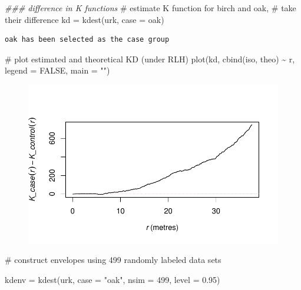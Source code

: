 \documentclass[
  letterpaper,
  DIV=11,
  numbers=noendperiod]{scrartcl}
\newenvironment{Shaded}{\begin{snugshade}}{\end{snugshade}}
\newcommand{\AttributeTok}[1]{\textcolor[rgb]{0.40,0.45,0.13}{#1}}
\newcommand{\CommentTok}[1]{\textcolor[rgb]{0.37,0.37,0.37}{#1}}
\newcommand{\ConstantTok}[1]{\textcolor[rgb]{0.56,0.35,0.01}{#1}}
\newcommand{\DecValTok}[1]{\textcolor[rgb]{0.68,0.00,0.00}{#1}}
\newcommand{\DocumentationTok}[1]{\textcolor[rgb]{0.37,0.37,0.37}{\textit{#1}}}
\newcommand{\FloatTok}[1]{\textcolor[rgb]{0.68,0.00,0.00}{#1}}
\newcommand{\FunctionTok}[1]{\textcolor[rgb]{0.28,0.35,0.67}{#1}}
\newcommand{\NormalTok}[1]{\textcolor[rgb]{0.00,0.23,0.31}{#1}}
\newcommand{\OtherTok}[1]{\textcolor[rgb]{0.00,0.23,0.31}{#1}}
\newcommand{\SpecialCharTok}[1]{\textcolor[rgb]{0.37,0.37,0.37}{#1}}
\newcommand{\StringTok}[1]{\textcolor[rgb]{0.13,0.47,0.30}{#1}}
\begin{document}
\begin{Shaded}
\begin{Highlighting}[]
\DocumentationTok{\#\#\# difference in K functions}
\CommentTok{\# estimate K function for birch and oak,}
\CommentTok{\# take their difference}
\NormalTok{kd }\OtherTok{=} \FunctionTok{kdest}\NormalTok{(urk, }\AttributeTok{case =} \StringTok{\textquotesingle{}oak\textquotesingle{}}\NormalTok{)}
\end{Highlighting}
\end{Shaded}

\begin{verbatim}
oak has been selected as the case group
\end{verbatim}

\begin{Shaded}
\begin{Highlighting}[]
\CommentTok{\# plot estimated and theoretical KD (under RLH)}
\FunctionTok{plot}\NormalTok{(kd, }\FunctionTok{cbind}\NormalTok{(iso, theo) }\SpecialCharTok{\textasciitilde{}}\NormalTok{ r, }\AttributeTok{legend =} \ConstantTok{FALSE}\NormalTok{, }\AttributeTok{main =} \StringTok{""}\NormalTok{)}
\end{Highlighting}
\end{Shaded}

\begin{figure}[H]

{\centering \includegraphics{cc-r-kd-hw_files/figure-pdf/unnamed-chunk-6-1.pdf}

}

\end{figure}

\begin{Shaded}
\begin{Highlighting}[]
\CommentTok{\# construct envelopes using 499 randomly labeled data sets}

\NormalTok{kdenv }\OtherTok{=} \FunctionTok{kdest}\NormalTok{(urk, }\AttributeTok{case =} \StringTok{"oak"}\NormalTok{, }\AttributeTok{nsim =} \DecValTok{499}\NormalTok{,}
              \AttributeTok{level =} \FloatTok{0.95}\NormalTok{)}
\end{Highlighting}
\end{Shaded}
\end{document}
